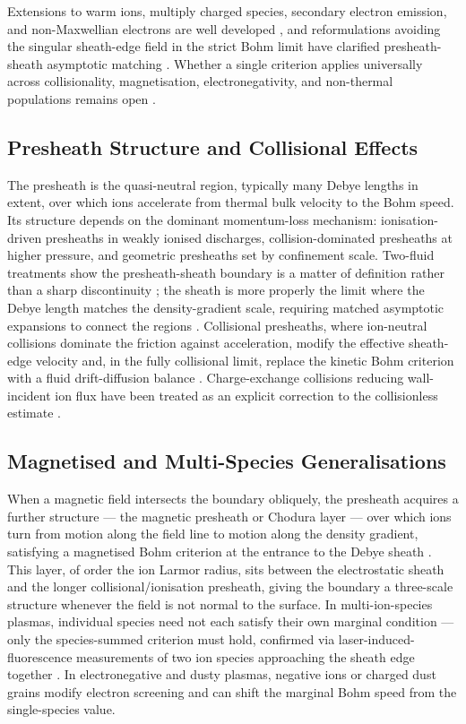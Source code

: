 Extensions to warm ions, multiply charged species, secondary electron emission, and non-Maxwellian electrons are well developed \cite{ref0004}, and reformulations avoiding the singular sheath-edge field in the strict Bohm limit have clarified presheath-sheath asymptotic matching \cite{ref0009}. Whether a single criterion applies universally across collisionality, magnetisation, electronegativity, and non-thermal populations remains open \cite{ref0015}.

\subsection{Presheath Structure and Collisional Effects}

The presheath is the quasi-neutral region, typically many Debye lengths in extent, over which ions accelerate from thermal bulk velocity to the Bohm speed. Its structure depends on the dominant momentum-loss mechanism: ionisation-driven presheaths in weakly ionised discharges, collision-dominated presheaths at higher pressure, and geometric presheaths set by confinement scale. Two-fluid treatments show the presheath-sheath boundary is a matter of definition rather than a sharp discontinuity \cite{ref0023}; the sheath is more properly the limit where the Debye length matches the density-gradient scale, requiring matched asymptotic expansions to connect the regions \cite{ref0013}. Collisional presheaths, where ion-neutral collisions dominate the friction against acceleration, modify the effective sheath-edge velocity and, in the fully collisional limit, replace the kinetic Bohm criterion with a fluid drift-diffusion balance \cite{ref0024}. Charge-exchange collisions reducing wall-incident ion flux have been treated as an explicit correction to the collisionless estimate \cite{ref0077}.

\subsection{Magnetised and Multi-Species Generalisations}

When a magnetic field intersects the boundary obliquely, the presheath acquires a further structure — the magnetic presheath or Chodura layer — over which ions turn from motion along the field line to motion along the density gradient, satisfying a magnetised Bohm criterion at the entrance to the Debye sheath \cite{ref0017}. This layer, of order the ion Larmor radius, sits between the electrostatic sheath and the longer collisional/ionisation presheath, giving the boundary a three-scale structure whenever the field is not normal to the surface. In multi-ion-species plasmas, individual species need not each satisfy their own marginal condition — only the species-summed criterion must hold, confirmed via laser-induced-fluorescence measurements of two ion species approaching the sheath edge together \cite{ref0329}. In electronegative and dusty plasmas, negative ions or charged dust grains modify electron screening and can shift the marginal Bohm speed from the single-species value.

